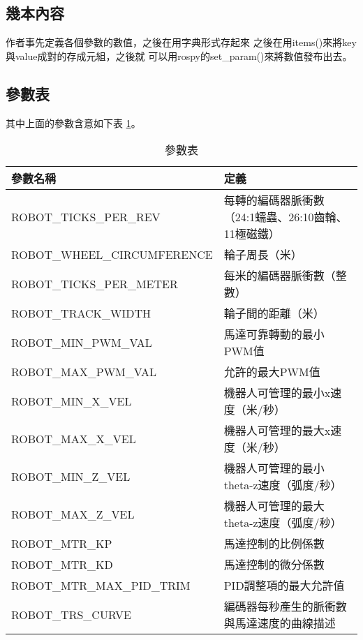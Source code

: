 \subsection{幾本內容}
作者事先定義各個參數的數值，之後在用字典形式存起來
之後在用items()來將key與value成對的存成元組，之後就
可以用rospy的set\_param()來將數值發布出去。

\clearpage
\subsection{參數表}
其中上面的參數含意如下表
\ref{table:example2}。
\begin{table}[ht]
\centering
\caption{參數表}
\begin{tabular}{|l|l|}
\hline
參數名稱 & 定義 \\
\hline
ROBOT\_TICKS\_PER\_REV & 每轉的編碼器脈衝數（24:1蠕蟲、26:10齒輪、11極磁鐵） \\
\hline
ROBOT\_WHEEL\_CIRCUMFERENCE & 輪子周長（米） \\
\hline
ROBOT\_TICKS\_PER\_METER & 每米的編碼器脈衝數（整數） \\
\hline
ROBOT\_TRACK\_WIDTH & 輪子間的距離（米） \\
\hline
ROBOT\_MIN\_PWM\_VAL & 馬達可靠轉動的最小PWM值 \\
\hline
ROBOT\_MAX\_PWM\_VAL & 允許的最大PWM值 \\
\hline
ROBOT\_MIN\_X\_VEL & 機器人可管理的最小x速度（米/秒） \\
\hline
ROBOT\_MAX\_X\_VEL & 機器人可管理的最大x速度（米/秒） \\
\hline
ROBOT\_MIN\_Z\_VEL & 機器人可管理的最小theta-z速度（弧度/秒） \\
\hline
ROBOT\_MAX\_Z\_VEL & 機器人可管理的最大theta-z速度（弧度/秒） \\
\hline
ROBOT\_MTR\_KP & 馬達控制的比例係數 \\
\hline
ROBOT\_MTR\_KD & 馬達控制的微分係數 \\
\hline
ROBOT\_MTR\_MAX\_PID\_TRIM & PID調整項的最大允許值 \\
\hline
ROBOT\_TRS\_CURVE & 編碼器每秒產生的脈衝數與馬達速度的曲線描述\\
\hline
\end{tabular}
\label{table:example2}
\end{table}

